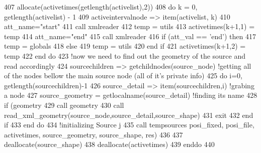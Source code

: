 \begin{DoxyCode}
407         \textcolor{keyword}{allocate}(activetimes(getlength(activelist),2))
408         \textcolor{keywordflow}{do} k = 0, getlength(activelist) - 1
409             activeintervalnode => item(activelist, k)
410             att\_name=\textcolor{stringliteral}{"start"}
411             \textcolor{keyword}{call }xmlreader%
412             temp = utils%
413             activetimes(k+1,1) = temp
414             att\_name=\textcolor{stringliteral}{"end"}
415             \textcolor{keyword}{call }xmlreader%
416             \textcolor{keywordflow}{if} (att\_val == \textcolor{stringliteral}{'end'}) \textcolor{keywordflow}{then}
417                 temp = globals%
418             \textcolor{keywordflow}{else}
419                 temp = utils%
420 \textcolor{keywordflow}{            end if}
421             activetimes(k+1,2) = temp
422 \textcolor{keywordflow}{        end do}
423         \textcolor{comment}{!now we need to find out the geometry of the source and read accordingly}
424         sourcechildren => getchildnodes(source\_node) \textcolor{comment}{!getting all of the nodes bellow the main source node
       (all of it's private info)}
425         \textcolor{keywordflow}{do} i=0, getlength(sourcechildren)-1
426             source\_detail => item(sourcechildren,i) \textcolor{comment}{!grabing a node}
427             source\_geometry = getlocalname(source\_detail)  \textcolor{comment}{!finding its name}
428             \textcolor{keywordflow}{if} (geometry%
429                 \textcolor{keyword}{call }geometry%
430                 \textcolor{keyword}{call }read\_xml\_geometry(source\_node,source\_detail,source\_shape)
431                 \textcolor{keywordflow}{exit}
432 \textcolor{keywordflow}{            end if}
433 \textcolor{keywordflow}{        end do}
434         \textcolor{comment}{!initializing Source j}
435         \textcolor{keyword}{call }tempsources%
       posi\_fixed, posi\_file, activetimes, source\_geometry, source\_shape, res)
436 
437         \textcolor{keyword}{deallocate}(source\_shape)
438         \textcolor{keyword}{deallocate}(activetimes)
439 \textcolor{keywordflow}{    enddo}
440 
\end{DoxyCode}
